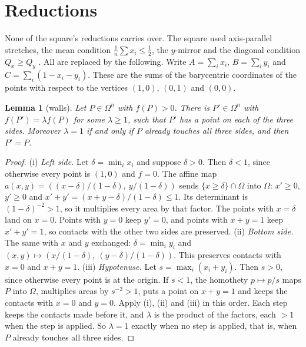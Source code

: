 \documentclass[11pt]{amsart}
\newtheorem{lemma}[theorem]{Lemma}
\theoremstyle{definition}
\newcommand{\Om}{\Omega}
\begin{document}
\section{Reductions}\label{sec:reductions}

None of the square's reductions carries over. The square used axis-parallel stretches, the mean condition $\frac1n\sum x_i \le \frac12$, the $y$-mirror and the diagonal condition $Q_x \ge Q_y$ \cite[Lemma~3.1]{N9}. All are replaced by the following. Write $A = \sum_i x_i$, $B = \sum_i y_i$ and $C = \sum_i (1 - x_i - y_i)$. These are the sums of the barycentric coordinates of the points with respect to the vertices $(1,0)$, $(0,1)$ and $(0,0)$. %

\begin{lemma}[walls]\label{lem:wall}
Let $P \in \Om^n$ with $f(P) > 0$. There is $P' \in \Om^n$ with $f(P') = \lambda f(P)$ for some $\lambda \ge 1$, such that $P'$ has a point on each of the three sides. Moreover $\lambda = 1$ if and only if $P$ already touches all three sides, and then $P' = P$.
\end{lemma}
\begin{proof}
(i) \emph{Left side.} Let $\delta = \min_i x_i$ and suppose $\delta > 0$. Then $\delta < 1$, since otherwise every point is $(1,0)$ and $f = 0$. The affine map $a(x,y) = ((x-\delta)/(1-\delta),\ y/(1-\delta))$ sends $\{x \ge \delta\}\cap\Om$ into $\Om$: $x' \ge 0$, $y' \ge 0$ and $x' + y' = (x + y - \delta)/(1-\delta) \le 1$. Its determinant is $(1-\delta)^{-2} > 1$, so it multiplies every area by that factor. The points with $x = \delta$ land on $x = 0$. Points with $y = 0$ keep $y' = 0$, and points with $x + y = 1$ keep $x' + y' = 1$, so contacts with the other two sides are preserved.
(ii) \emph{Bottom side.} The same with $x$ and $y$ exchanged: $\delta = \min_i y_i$ and $(x,y)\mapsto(x/(1-\delta),\ (y-\delta)/(1-\delta))$. This preserves contacts with $x = 0$ and $x + y = 1$.
(iii) \emph{Hypotenuse.} Let $s = \max_i(x_i + y_i)$. Then $s > 0$, since otherwise every point is at the origin. If $s < 1$, the homothety $p \mapsto p/s$ maps $P$ into $\Om$, multiplies areas by $s^{-2} > 1$, puts a point on $x + y = 1$ and keeps the contacts with $x = 0$ and $y = 0$.
Apply (i), (ii) and (iii) in this order. Each step keeps the contacts made before it, and $\lambda$ is the product of the factors, each $> 1$ when the step is applied. So $\lambda = 1$ exactly when no step is applied, that is, when $P$ already touches all three sides.
\end{proof}
\end{document}
